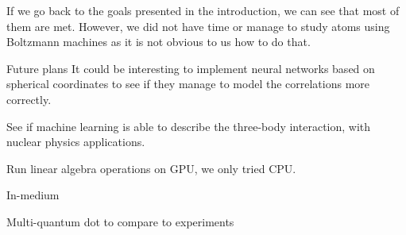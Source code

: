 If we go back to the goals presented in the introduction, we can see that most of them are met. However, we did not have time or manage to study atoms using Boltzmann machines as it is not obvious to us how to do that. 

Future plans
It could be interesting to implement neural networks based on spherical coordinates to see if they manage to model the correlations more correctly. 

See if machine learning is able to describe the three-body interaction, with nuclear physics applications. 

Run linear algebra operations on GPU, we only tried CPU. 

In-medium

Multi-quantum dot to compare to experiments